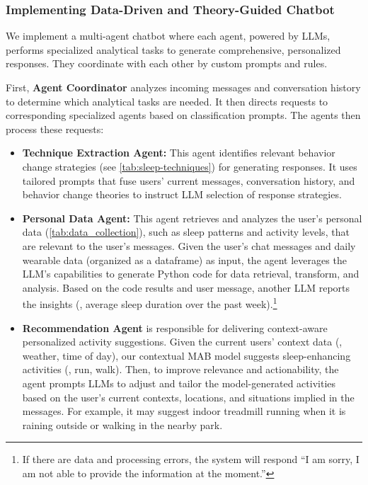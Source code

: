 \subsubsection{Implementing Data-Driven and Theory-Guided Chatbot}\label{subsec.chatbot_implementation}
We implement a multi-agent chatbot where each agent, powered by LLMs, performs specialized analytical tasks to generate comprehensive, personalized responses. 
They coordinate with each other by custom prompts and rules.

First, \textbf{Agent Coordinator} analyzes incoming messages and conversation history to determine which analytical tasks are needed. It then directs requests to corresponding specialized agents based on classification prompts.
The agents then process these requests:


\begin{itemize}
    \item \textbf{Technique Extraction Agent:} 
    This agent identifies relevant behavior change strategies (see \autoref{tab:sleep-techniques}) for generating responses.
    It uses tailored prompts that fuse users' current messages, conversation history, and behavior change theories to instruct LLM selection of response strategies.

    \item \textbf{Personal Data Agent:} This agent retrieves and analyzes the user's personal data (\autoref{tab:data_collection}), such as sleep patterns and activity levels, that are relevant to the user's messages.
    Given the user's chat messages and daily wearable data (organized as a dataframe) as input, the agent leverages the LLM's capabilities to generate Python code for data retrieval, transform, and analysis.
    Based on the code results and user message, another LLM reports the insights (\eg, average sleep duration over the past week).\footnote{If there are data and processing errors, the system will respond ``I am sorry, I am not able to provide the information at the moment.''}

    \item \textbf{Recommendation Agent} is responsible for delivering context-aware personalized activity suggestions.
    Given the current users' context data (\eg, weather, time of day), our contextual MAB model suggests sleep-enhancing activities (\eg, run, walk). Then, to improve relevance and actionability, the agent prompts LLMs to adjust and tailor the model-generated activities based on the user's current contexts, locations, and situations implied in the messages. For example, it may suggest indoor treadmill running when it is raining outside or walking in the nearby park.
   
\end{itemize}

